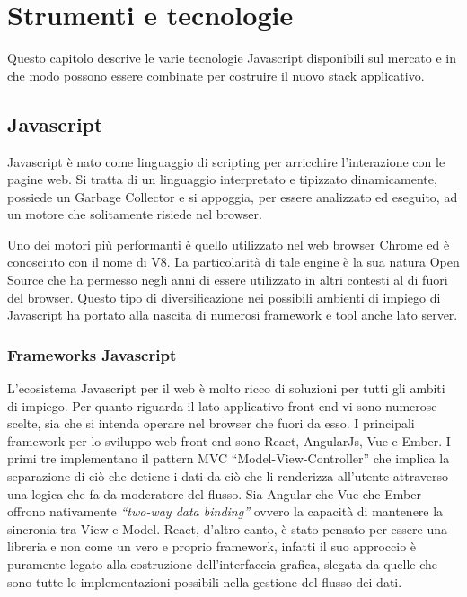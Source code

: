 \chapter{Strumenti e tecnologie}
\label{cha:intro}
\vspace{5mm}
Questo capitolo descrive le varie tecnologie Javascript disponibili sul mercato e in che modo possono essere combinate per costruire il nuovo stack applicativo.

\section{Javascript}\vspace{5mm}

Javascript è nato come linguaggio di scripting per arricchire l'interazione con le pagine web. Si tratta di un linguaggio interpretato e tipizzato dinamicamente, possiede un Garbage Collector\cite{GC} e si appoggia, per essere analizzato ed eseguito, ad un motore che solitamente risiede nel browser.

Uno dei motori più performanti è quello utilizzato nel web browser Chrome ed è conosciuto con il nome di V8\cite{V8}. La particolarità di tale engine è la sua natura Open Source che ha permesso negli anni di essere utilizzato in altri contesti al di fuori del browser. Questo tipo di diversificazione nei possibili ambienti di impiego di Javascript ha portato alla nascita di numerosi framework e tool anche lato server.

\subsection{Frameworks Javascript}\vspace{5mm}

	L’ecosistema Javascript per il web è molto ricco di soluzioni per tutti gli ambiti di impiego. Per quanto riguarda il lato applicativo front-end vi sono numerose scelte, sia che si intenda operare nel browser che fuori da esso. I principali framework per lo sviluppo web front-end sono React, AngularJs, Vue e Ember. I primi tre implementano il pattern MVC “Model-View-Controller” che implica la separazione di ciò che detiene i dati da ciò che li renderizza all’utente attraverso una logica che fa da moderatore del flusso. Sia Angular che Vue che Ember offrono nativamente \emph{“two-way data binding”} ovvero la capacità di mantenere la sincronia tra View e Model. React, d’altro canto, è stato pensato per essere una libreria e non come un vero e proprio framework, infatti il suo approccio è puramente legato alla costruzione dell’interfaccia grafica, slegata da quelle che sono tutte le implementazioni possibili nella gestione del flusso dei dati. \vspace{5mm}

